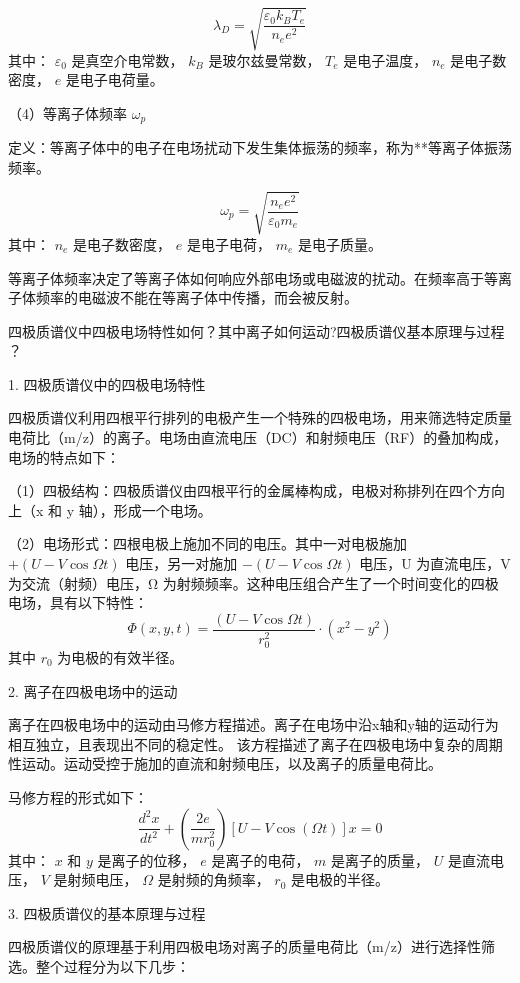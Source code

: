 \documentclass[dvipsnames, svgnames,a4paper,11pt]{article}
\begin{document}
  \[
  \lambda_D = \sqrt{\frac{\varepsilon_0 k_B T_e}{n_e e^2}}
  \]
  其中：
  \( \varepsilon_0 \) 是真空介电常数，
   \( k_B \) 是玻尔兹曼常数，
   \( T_e \) 是电子温度，
   \( n_e \) 是电子数密度，
   \( e \) 是电子电荷量。

（4）等离子体频率 \( \omega_p \)

定义：等离子体中的电子在电场扰动下发生集体振荡的频率，称为**等离子体振荡频率。

  \[
  \omega_p = \sqrt{\frac{n_e e^2}{\varepsilon_0 m_e}}
  \]
  其中：
   \( n_e \) 是电子数密度，
   \( e \) 是电子电荷，
  \( m_e \) 是电子质量。

等离子体频率决定了等离子体如何响应外部电场或电磁波的扰动。在频率高于等离子体频率的电磁波不能在等离子体中传播，而会被反射。


\begin{question}
	四极质谱仪中四极电场特性如何？其中离子如何运动?四极质谱仪基本原理与过程 ？
\end{question}
1. 四极质谱仪中的四极电场特性

四极质谱仪利用四根平行排列的电极产生一个特殊的四极电场，用来筛选特定质量电荷比（m/z）的离子。电场由直流电压（DC）和射频电压（RF）的叠加构成，电场的特点如下：

（1）四极结构：四极质谱仪由四根平行的金属棒构成，电极对称排列在四个方向上（x 和 y 轴），形成一个电场。

（2）电场形式：四根电极上施加不同的电压。其中一对电极施加 \( + (U - V \cos \Omega t) \) 电压，另一对施加 \( - (U - V \cos \Omega t) \) 电压，U 为直流电压，V 为交流（射频）电压，Ω 为射频频率。这种电压组合产生了一个时间变化的四极电场，具有以下特性：
  \[
  \Phi(x, y, t) = \frac{(U - V \cos \Omega t)}{r_0^2} \cdot (x^2 - y^2)
  \]
  其中 \(r_0\) 为电极的有效半径。

2. 离子在四极电场中的运动

离子在四极电场中的运动由马修方程描述。离子在电场中沿x轴和y轴的运动行为相互独立，且表现出不同的稳定性。
该方程描述了离子在四极电场中复杂的周期性运动。运动受控于施加的直流和射频电压，以及离子的质量电荷比。

马修方程的形式如下：
\[
\frac{d^2 x}{dt^2} + \left( \frac{2e}{m r_0^2} \right) \left[ U - V \cos(\Omega t) \right] x = 0
\]
其中：
 \(x\) 和 \(y\) 是离子的位移，
 \(e\) 是离子的电荷，
 \(m\) 是离子的质量，
 \(U\) 是直流电压，
 \(V\) 是射频电压，
 \(\Omega\) 是射频的角频率，
 \(r_0\) 是电极的半径。

3. 四极质谱仪的基本原理与过程

四极质谱仪的原理基于利用四极电场对离子的质量电荷比（m/z）进行选择性筛选。整个过程分为以下几步：
\end{document}
